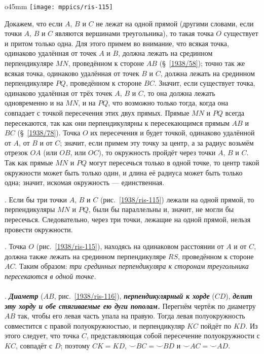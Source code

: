 \begin{wrapfigure}{o}{45mm}
\centering
\texttt{[image: mppics/ris-115]}
\caption{}\label{1938/ris-115}
\end{wrapfigure}

Докажем, что если $A$, $B$ и $C$ не лежат на одной прямой 
(другими словами, если точки $A$, $B$ и $C$ являются вершинами треугольника),
то такая точка $O$ существует и притом только одна.
Для этого примем во внимание, что всякая точка, одинаково удалённая от точек $A$ и $B$, должна лежать на срединном перпендикуляре $MN$, проведённом к стороне $AB$ (§~\ref{1938/58}); 
точно так же всякая точка, одинаково удалённая от точек $B$ и $C$, должна лежать на срединном перпендикуляре $PQ$, проведённом к стороне $BC$.
Значит, если существует точка, одинаково удалённая от трёх точек $A$, $B$ и $C$, то она должна лежать одновременно и на $MN$, и на $PQ$, что возможно только тогда, когда она совпадает с точкой пересечения этих двух прямых.
Прямые $MN$ и $PQ$ всегда пересекаются, так как они перпендикулярны к пересекающимся прямым $AB$ и $BC$ (§~\ref{1938/78}).
Точка $O$ их пересечения и будет точкой, одинаково удалённой от $A$, от $B$ и от $C$;
значит, если примем эту точку за центр, а за радиус возьмём отрезок $OA$ (или $OB$, или $OC$), то окружность пройдёт через точки $A$, $B$ и $C$.
Так как прямые $MN$ и $PQ$ могут пересечься только в одной точке, то центр такой окружности может быть только один, и длина её радиуса может быть только одна;
значит, искомая окружность — единственная.

{\small

\smallskip
{}.
Если бы три точки $A$, $B$ и $C$ (рис.~\ref{1938/ris-115}) лежали на одной прямой, то перпендикуляры $MN$ и $PQ$, были бы параллельны и, значит, не могли бы пересечься.
Следовательно, через три точки, лежащие на одной прямой, нельзя провести окружности.

}

\smallskip
{}.
Точка $O$ (рис.~\ref{1938/ris-115}), находясь на одинаковом расстоянии от $A$ и от $C$, должна также лежать на срединном перпендикуляре $RS$, проведённом к стороне $AC$. 
Таким образом:
\emph{три срединных перпендикуляра к сторонам треугольника пересекаются в одной точке.}

\paragraph{}\label{1938/105}
\mbox{.}
\textbf{\emph{Диаметр}} ($AB$, рис.~\ref{1938/ris-116}), \textbf{\emph{перпендикулярный к хорде}} ($CD$), \textbf{\emph{делит эту хорду и обе стягиваемые ею дуги пополам.}}
Перегнём чертёж по диаметру $AB$ так, чтобы его левая часть упала на правую.
Тогда левая полуокружность совместится с правой полуокружностью, и перпендикуляр $KC$ пойдёт по $KD$.
Из этого следует, что точка $C$, представляющая собой пересечение полуокружности с $KC$, совпадёт с $D$;
поэтому $CK=KD$,
${\smallsmile} BC={\smallsmile} BD$ и
${\smallsmile} AC={\smallsmile} AD$.

